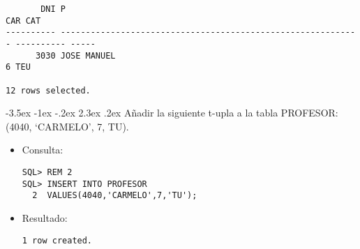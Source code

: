 \documentclass[11pt]{report}
\makeatletter
\renewcommand\chapter{\@startsection{chapter}{0}{\z@}%
    {-3.5ex \@plus -1ex \@minus -.2ex}%
    {2.3ex \@plus.2ex}%
    {\normalfont\Large\bfseries}}
\makeatother
\begin{document}
\begin{itemize}
\begin{verbatim}
       DNI P                                                                   CAR CAT                                                                                                                  
---------- ------------------------------------------------------------ ---------- -----                                                                                                                
      3030 JOSE MANUEL                                                           6 TEU                                                                                                                  

12 rows selected.
  \end{verbatim}
\end{itemize}

\chapter{Añadir la siguiente t-upla a la tabla PROFESOR: (4040, ‘CARMELO’, 7, TU).}
\begin{itemize}
  \item Consulta:
  \begin{verbatim}
SQL> REM 2
SQL> INSERT INTO PROFESOR
  2  VALUES(4040,'CARMELO',7,'TU');
  \end{verbatim}
  \item{Resultado:}
  \begin{verbatim}
1 row created.
  \end{verbatim}
\end{itemize}

\end{document}
